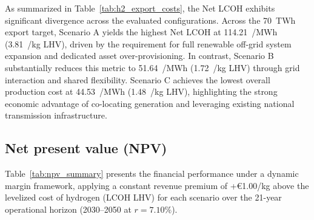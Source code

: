\documentclass[preprint,12pt]{elsarticle}
\begin{document}
As summarized in Table~\ref{tab:h2_export_costs}, the Net LCOH exhibits significant divergence across the evaluated configurations. Across the 70~TWh export target, Scenario A yields the highest Net LCOH at 114.21~\texteuro/MWh (3.81~\texteuro/kg LHV), driven by the requirement for full renewable off-grid system expansion and dedicated asset over-provisioning. In contrast, Scenario B substantially reduces this metric to 51.64~\texteuro/MWh (1.72~\texteuro/kg LHV) through grid interaction and shared flexibility. Scenario C achieves the lowest overall production cost at 44.53~\texteuro/MWh (1.48~\texteuro/kg LHV), highlighting the strong economic advantage of co-locating generation and leveraging existing national transmission infrastructure.

\subsection{Net present value (NPV)}
Table~\ref{tab:npv_summary} presents the financial performance under a dynamic margin framework, applying a constant revenue premium of +€1.00/kg above the levelized cost of hydrogen (LCOH LHV) for each scenario over the 21-year operational horizon (2030–2050 at $r = 7.10\%$).
\begin{table}[ht]
\centering
\caption{Annual operational cash flows, project return metrics, and multi-year discounted financial evaluation by scenario (2030–2050) under a dynamic cost-plus revenue margin pricing model ($+\text{€}1.00/\text{kg}$ over scenario-specific LCOH at LHV) and an assumed zero $\text{CO}_2$ emission tax, evaluated at a discount rate of $r = 7.10\%$.}
\label{tab:npv_summary}
\small
\setlength{\tabcolsep}{8pt}
\end{table}
\end{document}
